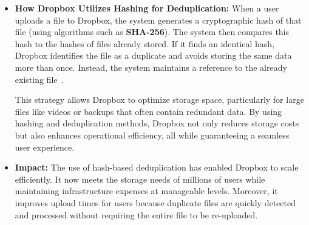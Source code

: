 \documentclass[11pt,a4paper]{article}
\begin{document}
        \begin{itemize}
            \item \textbf{How Dropbox Utilizes Hashing for Deduplication:}
            \newline
            When a user uploads a file to Dropbox, the system generates a cryptographic hash of that file (using algorithms such as \textbf{SHA-256}). The system then compares this hash to the hashes of files already stored. If it finds an identical hash, Dropbox identifies the file as a duplicate and avoids storing the same data more than once. Instead, the system maintains a reference to the already existing file~\cite{Dropbox}\cite{Dropbox-2}.
            \par
            This strategy allows Dropbox to optimize storage space, particularly for large files like videos or backups that often contain redundant data. By using hashing and deduplication methods, Dropbox not only reduces storage costs but also enhances operational efficiency, all while guaranteeing a seamless user experience.

            \item \textbf{Impact:}
            \newline
            The use of hash-based deduplication has enabled Dropbox to scale efficiently. It now meets the storage needs of millions of users while maintaining infrastructure expenses at manageable levels. Moreover, it improves upload times for users because duplicate files are quickly detected and processed without requiring the entire file to be re-uploaded.

        \end{itemize}
\end{document}
